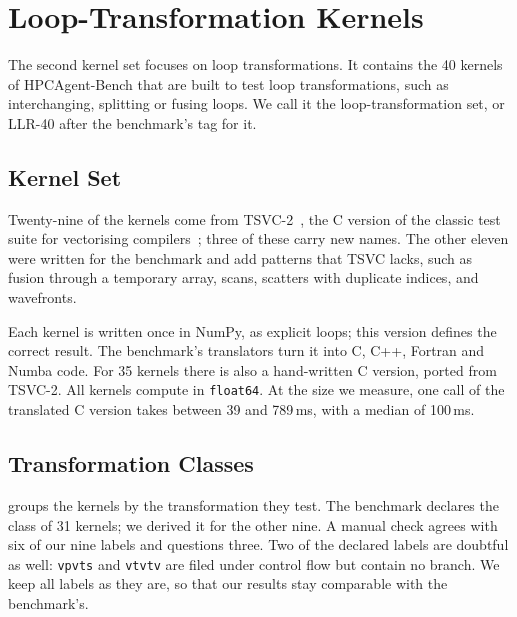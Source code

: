 \chapter{Loop-Transformation Kernels}
\label{ch:loop-kernels}

The second kernel set focuses on loop transformations. It contains the 40 kernels of
HPCAgent-Bench that are built to test loop transformations, such as interchanging, splitting or
fusing loops. We call it the loop-transformation set, or LLR-40 after the benchmark's tag
for it.

\section{Kernel Set}
\label{sec:loop-kernel-set}

Twenty-nine of the kernels come from TSVC-2~\cite{tsvc2}, the C version of the classic test
suite for vectorising compilers~\cite{callahan1988tsvc,maleki2011evaluation}; three of these
carry new names. The other eleven were written for the benchmark and add patterns that TSVC
lacks, such as fusion through a temporary array, scans, scatters with duplicate indices, and
wavefronts.

Each kernel is written once in NumPy, as explicit loops; this version defines the correct
result. The benchmark's translators turn it into C, C++, Fortran and Numba code. For 35 kernels
there is also a hand-written C version, ported from TSVC-2. All kernels compute in
\texttt{float64}. At the size we measure, one call of the translated C version takes between
39 and 789\,ms, with a median of 100\,ms.

\section{Transformation Classes}
\label{sec:loop-kernel-classes}

 groups the kernels by the transformation they test. The benchmark
declares the class of 31 kernels; we derived it for the other nine. A manual check agrees with
six of our nine labels and questions three. Two of the declared labels are doubtful as well:
\texttt{vpvts} and \texttt{vtvtv} are filed under control flow but contain no branch. We keep
all labels as they are, so that our results stay comparable with the benchmark's.

